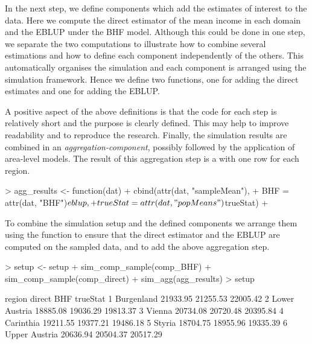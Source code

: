 \documentclass[article]{ajs}
\begin{document}
In the next step, we define components which add the estimates of interest to the data. Here we compute the direct estimator of the mean income in each domain and the EBLUP under the BHF model. Although this could be done in one step, we separate the two computations to illustrate how to combine several estimations and how to define each component independently of the others. This automatically organises the simulation and each component is arranged using the simulation framework. Hence we define two functions, one for adding the direct estimates and one for adding the EBLUP.

\begin{Schunk}
\end{Schunk}

A positive aspect of the above definitions is that the code for each step is relatively short and the purpose is clearly defined. This may help to improve readability and to reproduce the research. Finally, the simulation results are combined in an \textit{aggregation-component}, possibly followed by the application of area-level models. The result of this aggregation step is a  with one row for each region.

\begin{Schunk}
\begin{Sinput}
> agg_results <- function(dat) {
+   cbind(attr(dat, "sampleMean"),
+         BHF = attr(dat, "BHF")$eblup,
+         trueStat = attr(dat, "popMeans")$trueStat)
+ }
\end{Sinput}
\end{Schunk}

To combine the simulation setup and the defined components we arrange them using the function  to ensure that the direct estimator and the EBLUP are computed on the sampled data, and  to add the above aggregation step.

\begin{Schunk}
\begin{Sinput}
> setup <- setup %
+   sim_comp_sample(comp_BHF) %
+   sim_comp_sample(comp_direct) %
+   sim_agg(agg_results)
> setup
\end{Sinput}
\begin{Soutput}
         region   direct      BHF trueStat
1    Burgenland 21933.95 21255.53 22005.42
2 Lower Austria 18885.08 19036.29 19813.37
3        Vienna 20734.08 20720.48 20395.84
4     Carinthia 19211.55 19377.21 19486.18
5        Styria 18704.75 18955.96 19335.39
6 Upper Austria 20636.94 20504.37 20517.29
\end{Soutput}
\end{Schunk}
\end{document}
